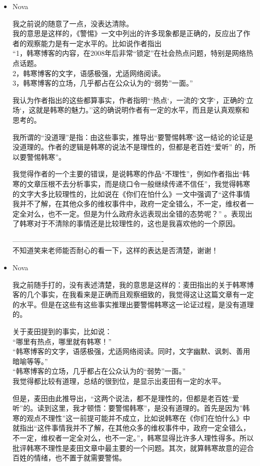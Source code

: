 \begin{itemize}[<+->]
\item
  Nova

  我之前说的随意了一点，没表达清除。\\
  我的意思是这样的，《警惕》一文中列出的许多现象都是正确的，反应出了作者的观察能力是有一定水平的。比如说作者指出\\
  ``1，韩寒博客的内容，在2008年后非常``锁定''在社会热点问题，特别是网络热点话题。\\
  2，韩寒博客的文字，语感极强，尤适网络阅读。\\
  3，韩寒博客的立场，几乎都占在公众认为的``弱势''一面。''

  我认为作者指出的这些都算事实，作者指明```热点`，一流的`文字`，正确的`立场`，这就是韩寒的魅力。''这的确说明作者有一定的水平，而且是认真观察和思考的。

  我所谓的``没道理''是指：由这些事实，推导出``要警惕韩寒``这一结论的论证是没道理的。作者的逻辑是韩寒的说法不是理性的，但都是老百姓``爱听''
  的，所以要警惕韩寒''。

  我觉得作者的一个主要的错误，是说韩寒的作品``不理性''，例如作者指出``韩寒的文章压根不去分析事实，而是绕口令一般继续传递不信任''，我觉得韩寒的文字大多比较理性的，比如说在《你们在怕什么》一文中强调了``这件事情我并不了解，在其他众多的维权事件中，政府一定全错么，不一定，维权者一定全对么，也不一定。但是为什么政府永远表现出全错的态势呢？''
  。表现出了韩寒对于不清除的事情还是比较理性的，这也是我喜欢他的一个原因。

  ----------------------------------------------------------------\\
  不知道笑来老师能否耐心的看一下，这样的表达是否清楚，谢谢！
\item
  Nova

  我之前随手打的，没有表述清楚，我的意思是这样的：麦田指出的关于韩寒博客的几个事实，在我看来是正确而且观察细致的，我觉得这让这篇文章有一定的水平。但是在这些有这些事实推理出要警惕韩寒这一论证过程，是没有道理的。

  关于麦田提到的事实，比如说：\\ ``哪里有热点，哪里就有韩寒！''\\
  ``韩寒博客的文字，语感极强，尤适网络阅读。同时，文字幽默、讽刺、善用暗喻等等。''\\
  ``韩寒博客的立场，几乎都占在公众认为的``弱势''一面。''\\
  我觉得都比较有道理，总结的很到位，是显示出麦田有一定的水平。

  但是，麦田由此推导出，``这两个说法，都不是理性的，但都是老百姓``爱听''的。读到这里，我才顿悟：要警惕韩寒''，是没有道理的。首先是因为''韩寒的观点不理性''这一前提可能并不成立，比如说韩寒在《你们在怕什么》中就指出``这件事情我并不了解，在其他众多的维权事件中，政府一定全错么，不一定，维权者一定全对么，也不一定。''，韩寒显得比许多人理性得多。所以批评韩寒不理性是麦田文章中最主要的一个问题。其次，就算韩寒故意的迎合百姓的情绪，也不置于就需要警惕。


\end{itemize}
